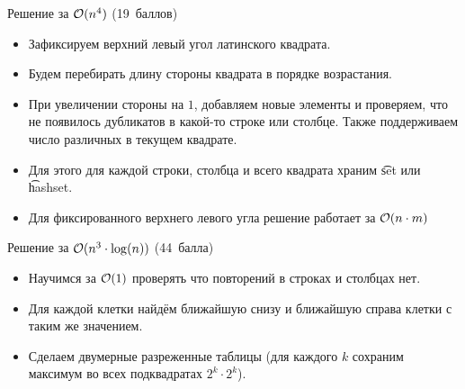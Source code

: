 \begin{frame}{Решение за $\mathcal{O}(n ^ 4)$ (19~баллов)}
  \vspace{-0.7em}
  \begin{itemize}
  \item Зафиксируем верхний левый угол латинского квадрата.
  \item Будем перебирать длину стороны квадрата в порядке возрастания.
  \item При увеличении стороны на $1$, добавляем новые элементы и проверяем, что не появилось дубликатов в какой-то строке или столбце.
    Также поддерживаем число различных в текущем квадрате.
  \item Для этого для каждой строки, столбца и всего квадрата храним \t{set} или \t{hashset}.
  \item Для фиксированного верхнего левого угла решение работает за $\mathcal{O}(n \cdot m)$
  \end{itemize}
\end{frame}


\begin{frame}{Решение за $\mathcal{O}(n ^ 3 \cdot \log(n))$ (44~балла)}
  \begin{itemize}
  \item Научимся за $\mathcal{O}(1)$ проверять что повторений в строках и столбцах нет.
  \item Для каждой клетки найдём ближайшую снизу и ближайшую справа клетки с таким же значением.
  \item Сделаем двумерные разреженные таблицы (для каждого $k$ сохраним максимум во всех подквадратах $2^k \cdot 2^k$).
  \end{itemize}
\end{frame}


